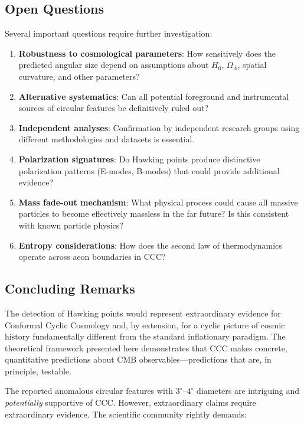 \documentclass[11pt,a4paper]{article}
\theoremstyle{plain}
\theoremstyle{definition}
\theoremstyle{remark}
\begin{document}
\subsection{Open Questions}

Several important questions require further investigation:

\begin{enumerate}
    \item \textbf{Robustness to cosmological parameters}: How sensitively does the predicted angular size depend on assumptions about $H_0$, $\Omega_\Lambda$, spatial curvature, and other parameters?
    
    \item \textbf{Alternative systematics}: Can all potential foreground and instrumental sources of circular features be definitively ruled out?
    
    \item \textbf{Independent analyses}: Confirmation by independent research groups using different methodologies and datasets is essential.
    
    \item \textbf{Polarization signatures}: Do Hawking points produce distinctive polarization patterns (E-modes, B-modes) that could provide additional evidence?
    
    \item \textbf{Mass fade-out mechanism}: What physical process could cause all massive particles to become effectively massless in the far future? Is this consistent with known particle physics?
    
    \item \textbf{Entropy considerations}: How does the second law of thermodynamics operate across aeon boundaries in CCC?
\end{enumerate}

\subsection{Concluding Remarks}

The detection of Hawking points would represent extraordinary evidence for Conformal Cyclic Cosmology and, by extension, for a cyclic picture of cosmic history fundamentally different from the standard inflationary paradigm. The theoretical framework presented here demonstrates that CCC makes concrete, quantitative predictions about CMB observables---predictions that are, in principle, testable.

The reported anomalous circular features with $3^\circ$--$4^\circ$ diameters are intriguing and \emph{potentially} supportive of CCC. However, extraordinary claims require extraordinary evidence. The scientific community rightly demands:
\end{document}
